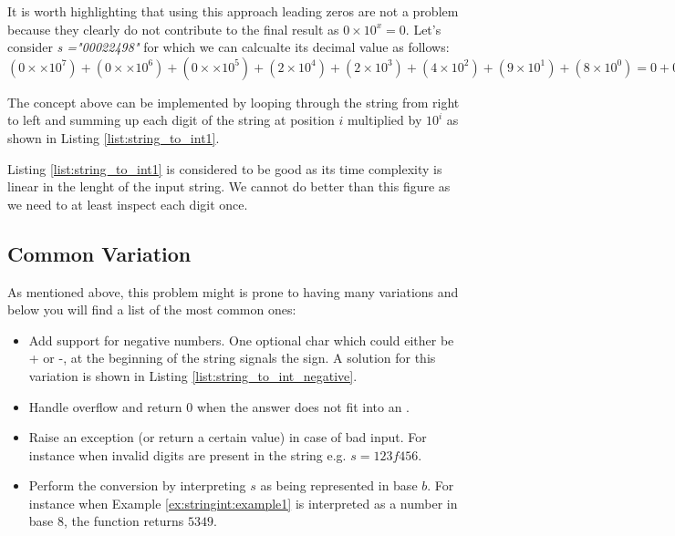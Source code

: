 It is worth highlighting that using this approach leading zeros are not a problem because they clearly do not contribute to the final result as $0 \times 10^x = 0$. Let's consider \textit{s ="00022498"} for which we can calcualte its decimal value as follows:  $(0 \times \times 10^7) + (0 \times \times 10^6) + (0 \times \times 10^5) + (2 \times 10^4) + (2 \times 10^3) + (4 \times 10^2) + (9 \times 10^1) + (8 \times 10^0) = 0+0+0+20000 + 2000 + 400 +90 +8 = 22498$

The concept above can be implemented by looping through the string from right to left and summing up each digit of the string at position $i$  multiplied by $10^i$ as shown in Listing \ref{list:string_to_int1}.



Listing \ref{list:string_to_int1} is considered to be good as its time complexity is linear in the lenght of the input string. We cannot do better than this figure as we need to at least inspect each digit once.

\subsection{Common Variation}
As mentioned above, this problem might is prone to having many variations and below you will find a list of the most common ones: 
\begin{itemize}
	\item Add support for negative numbers. One optional char which could either be + or -, at the beginning of the string signals the sign. A solution for this variation is shown in Listing \ref{list:string_to_int_negative}.
	\item Handle overflow and return $0$ when the answer does not fit into an .
	\item Raise an exception (or return a certain value) in case of bad input. For instance when invalid digits are present in the string e.g. $s=123f456$.
	\item Perform the conversion by interpreting $s$ as being represented in base $b$. For instance when Example \ref{ex:stringint:example1} is interpreted as a number in base $8$, the function returns $5349$. 
\end{itemize}

